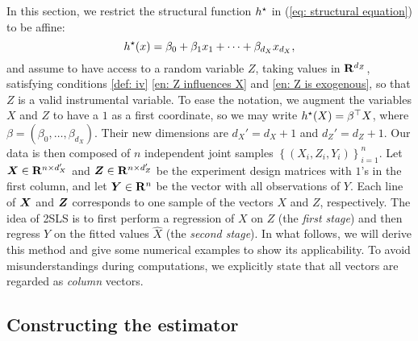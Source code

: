 In this section, we restrict the structural function $ h^{ \star } $ in (\ref{eq: structural equation}) to be affine:
\begin{equation}
    \label{}
    h^{ \star } ( x ) = \beta_{ 0 } + \beta_{ 1 } x_{ 1 } + \cdots + \beta_{ d_{ X } } x_{ d_{ X } }
,\end{equation}
and assume to have access to a random variable $ Z $, taking values in $ \mathbf{R}^{ d_{ Z } } $, satisfying conditions \ref{def: iv} \ref{en: Z influences X} and \ref{en: Z is exogenous}, so that $ Z $ is a valid instrumental variable.
To ease the notation, we augment the variables $ X $ and $ Z $ to have a $ 1 $ as a first coordinate, so we may write $ h^{ \star } ( X ) = \beta^{ \top } X $, where $ \beta = ( \beta_{ 0 }, \dots, \beta_{ d_{ X } } ) $.
Their new dimensions are $ d_{ X }' = d_{ X } + 1 $ and $ d_{ Z }' = d_{ Z } + 1 $.
Our data is then composed of $ n $ independent joint samples $ \left\{ ( X_{ i }, Z_{ i }, Y_{ i } ) \right\}_{ i=1 }^{ n } $.
Let $ \boldsymbol X \in \mathbf{R}^{ n \times d_{ X }' } $ and $ \boldsymbol Z \in \mathbf{R}^{ n \times d_{ Z }' } $ be the experiment design matrices with $ 1 $'s in the first column, and let $ \boldsymbol Y \in \mathbf{R}^{ n } $ be the vector with all observations of $ Y $.
Each line of $ \boldsymbol X $ and $ \boldsymbol Z $ corresponds to one sample of the vectors $ X $ and $ Z $, respectively.
The idea of 2SLS is to first perform a regression of $ X $ on $ Z $ (the \emph{first stage}) and then regress $ Y $ on the fitted values $ \hat{ X } $ (the \emph{second stage}).
In what follows, we will derive this method and give some numerical examples to show its applicability.
To avoid misunderstandings during computations, we explicitly state that all vectors are regarded as \emph{column} vectors.

\subsection{Constructing the estimator}

